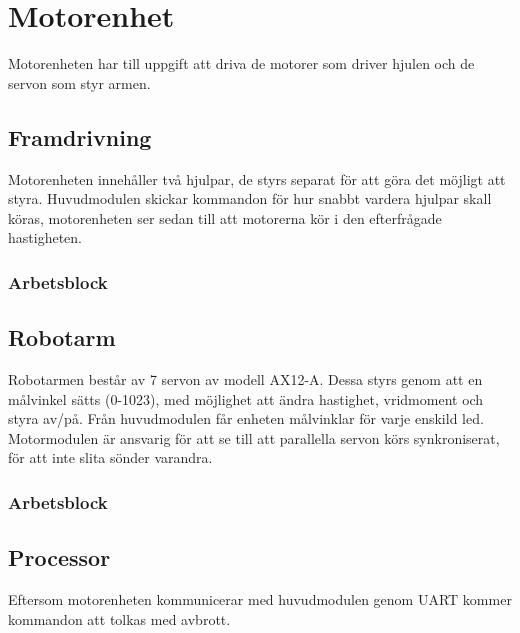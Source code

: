 \section{Motorenhet}

Motorenheten har till uppgift att driva de motorer som driver hjulen och de servon som styr armen.

\subsection{Framdrivning}

Motorenheten innehåller två hjulpar, de styrs separat för att göra det möjligt att styra. Huvudmodulen skickar kommandon för hur snabbt vardera hjulpar skall köras, motorenheten ser sedan till att motorerna kör i den efterfrågade hastigheten.

\subsubsection{Arbetsblock}


\subsection{Robotarm}

Robotarmen består av 7 servon av modell AX12-A. Dessa styrs genom att en målvinkel sätts (0-1023), med möjlighet att ändra hastighet, vridmoment och styra av/på. Från huvudmodulen får enheten målvinklar för varje enskild led. Motormodulen är ansvarig för att se till att parallella servon körs synkroniserat, för att inte slita sönder varandra.  


\subsubsection{Arbetsblock}


\subsection{Processor}

Eftersom motorenheten kommunicerar med huvudmodulen genom UART kommer kommandon att tolkas med avbrott.